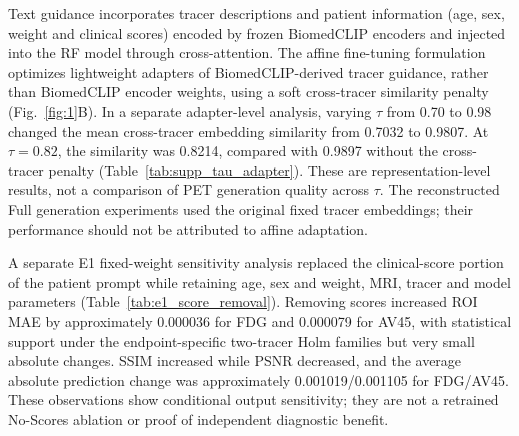 Text guidance incorporates tracer descriptions and patient information (age, sex, weight and clinical scores) encoded by frozen BiomedCLIP encoders and injected into the RF model through cross-attention. The affine fine-tuning formulation optimizes lightweight adapters of BiomedCLIP-derived tracer guidance, rather than BiomedCLIP encoder weights, using a soft cross-tracer similarity penalty (Fig.~\ref{fig:1}B). In a separate adapter-level analysis, varying $\tau$ from 0.70 to 0.98 changed the mean cross-tracer embedding similarity from 0.7032 to 0.9807. At $\tau=0.82$, the similarity was 0.8214, compared with 0.9897 without the cross-tracer penalty (Table~\ref{tab:supp_tau_adapter}). These are representation-level results, not a comparison of PET generation quality across $\tau$. The reconstructed Full generation experiments used the original fixed tracer embeddings; their performance should not be attributed to affine adaptation.

A separate E1 fixed-weight sensitivity analysis replaced the clinical-score portion of the patient prompt while retaining age, sex and weight, MRI, tracer and model parameters (Table~\ref{tab:e1_score_removal}). Removing scores increased ROI MAE by approximately 0.000036 for FDG and 0.000079 for AV45, with statistical support under the endpoint-specific two-tracer Holm families but very small absolute changes. SSIM increased while PSNR decreased, and the average absolute prediction change was approximately 0.001019/0.001105 for FDG/AV45. These observations show conditional output sensitivity; they are not a retrained No-Scores ablation or proof of independent diagnostic benefit.
